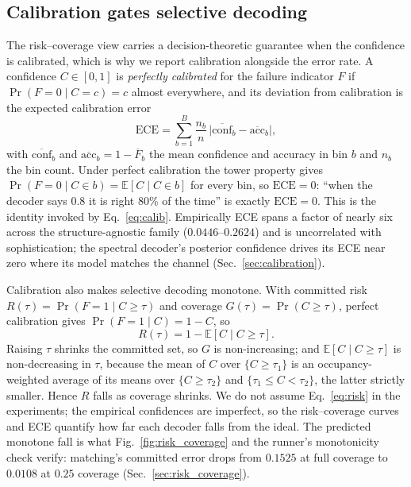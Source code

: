 \documentclass[reprint,aps,prxquantum,amsmath,amssymb,floatfix,nofootinbib,longbibliography]{revtex4-2}
\theoremstyle{definition}
\theoremstyle{remark}
\theoremstyle{plain}
\newcommand{\sync}[1]{#1}
\begin{document}
\subsection{Calibration gates selective decoding}
\label{sec:theory_selective}

The risk--coverage view carries a decision-theoretic guarantee when the confidence is calibrated, which is why we report calibration alongside the error rate. A confidence $C\in[0,1]$ is \emph{perfectly calibrated} for the failure indicator $F$ if $\Pr(F=0\mid C=c)=c$ almost everywhere, and its deviation from calibration is the expected calibration error
\begin{equation}
  \mathrm{ECE}=\sum_{b=1}^{B}\frac{n_b}{n}\,\bigl\lvert\overline{\mathrm{conf}}_b-\overline{\mathrm{acc}}_b\bigr\rvert,
  \label{eq:ece}
\end{equation}
with $\overline{\mathrm{conf}}_b$ and $\overline{\mathrm{acc}}_b=1-\overline F_b$ the mean confidence and accuracy in bin $b$ and $n_b$ the bin count. Under perfect calibration the tower property gives $\Pr(F=0\mid C\in b)=\mathbb E[C\mid C\in b]$ for every bin, so $\mathrm{ECE}=0$: ``when the decoder says $0.8$ it is right $80\%$ of the time'' is exactly $\mathrm{ECE}=0$. This is the identity invoked by Eq.~\eqref{eq:calib}. Empirically ECE spans a factor of nearly six across the structure-agnostic family ($\sync{0.0446}$--$\sync{0.2624}$) and is uncorrelated with sophistication; the spectral decoder's posterior confidence drives its ECE near zero where its model matches the channel (Sec.~\ref{sec:calibration}).

Calibration also makes selective decoding monotone. With committed risk $R(\tau)=\Pr(F=1\mid C\ge\tau)$ and coverage $G(\tau)=\Pr(C\ge\tau)$, perfect calibration gives $\Pr(F=1\mid C)=1-C$, so
\begin{equation}
  R(\tau)=1-\mathbb E[C\mid C\ge\tau].
  \label{eq:risk}
\end{equation}
Raising $\tau$ shrinks the committed set, so $G$ is non-increasing; and $\mathbb E[C\mid C\ge\tau]$ is non-decreasing in $\tau$, because the mean of $C$ over $\{C\ge\tau_1\}$ is an occupancy-weighted average of its means over $\{C\ge\tau_2\}$ and $\{\tau_1\le C<\tau_2\}$, the latter strictly smaller. Hence $R$ falls as coverage shrinks. We do not assume Eq.~\eqref{eq:risk} in the experiments; the empirical confidences are imperfect, so the risk--coverage curves and ECE quantify how far each decoder falls from the ideal. The predicted monotone fall is what Fig.~\ref{fig:risk_coverage} and the runner's monotonicity check verify: matching's committed error drops from $\sync{0.1525}$ at full coverage to $\sync{0.0108}$ at $\sync{0.25}$ coverage (Sec.~\ref{sec:risk_coverage}).
\end{document}
